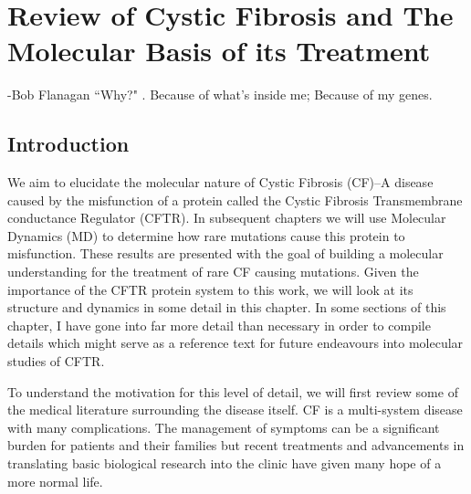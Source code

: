 \chapter{Review of Cystic Fibrosis and The Molecular Basis of its Treatment}
\label{chap:cftr}
\begin{chapquote}{-Bob Flanagan ``Why?" \cite{dick1997}.}
Because of what's inside me; Because of my genes.
\end{chapquote}





\section{Introduction}
\label{cftr_lit_review_intro}
We aim to elucidate the molecular nature of Cystic Fibrosis (CF)--A disease caused by the misfunction of a protein called the Cystic Fibrosis Transmembrane conductance Regulator (CFTR). In subsequent chapters we will use Molecular Dynamics (MD) to determine how rare mutations cause 
this protein to misfunction. These results are presented with the goal of building a molecular understanding for the treatment of rare CF causing mutations. Given the importance of the CFTR protein system to this work, we will look at its structure and dynamics in some detail in this chapter. In some sections of this chapter, I have gone into far more detail than necessary in order to compile details which might serve as a reference text for future endeavours into molecular studies of CFTR. 

To understand the motivation for this level of detail, we will first review some of the medical literature surrounding the disease itself. CF is a multi-system disease with many complications. The management of symptoms can be a significant burden for patients and their families but recent treatments and advancements in translating basic biological research into the clinic have given many hope of a more normal life. 

